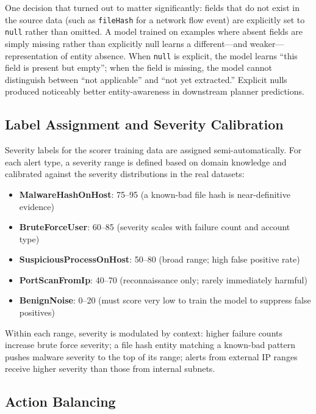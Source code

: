 One decision that turned out to matter significantly: fields that do not exist in the source data (such as \texttt{fileHash} for a network flow event) are explicitly set to \texttt{null} rather than omitted. A model trained on examples where absent fields are simply missing rather than explicitly null learns a different---and weaker---representation of entity absence. When \texttt{null} is explicit, the model learns ``this field is present but empty''; when the field is missing, the model cannot distinguish between ``not applicable'' and ``not yet extracted.'' Explicit nulls produced noticeably better entity-awareness in downstream planner predictions.

\subsection{Label Assignment and Severity Calibration}

Severity labels for the scorer training data are assigned semi-automatically. For each alert type, a severity range is defined based on domain knowledge and calibrated against the severity distributions in the real datasets:

\begin{itemize}
    \item \textbf{MalwareHashOnHost}: 75--95 (a known-bad file hash is near-definitive evidence)
    \item \textbf{BruteForceUser}: 60--85 (severity scales with failure count and account type)
    \item \textbf{SuspiciousProcessOnHost}: 50--80 (broad range; high false positive rate)
    \item \textbf{PortScanFromIp}: 40--70 (reconnaissance only; rarely immediately harmful)
    \item \textbf{BenignNoise}: 0--20 (must score very low to train the model to suppress false positives)
\end{itemize}

Within each range, severity is modulated by context: higher failure counts increase brute force severity; a file hash entity matching a known-bad pattern pushes malware severity to the top of its range; alerts from external IP ranges receive higher severity than those from internal subnets.

\subsection{Action Balancing}


